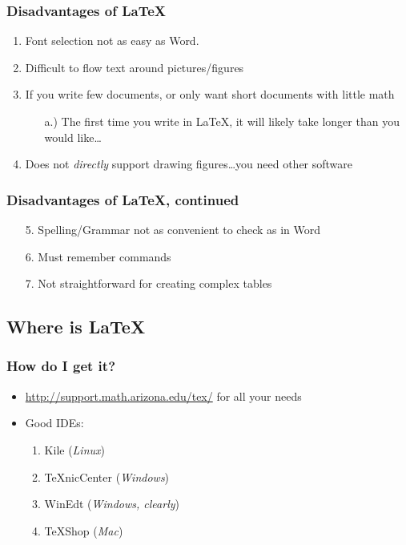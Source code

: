 \documentclass{beamer}
\begin{document}
\begin{frame}
   \frametitle{Disadvantages of \LaTeX}
   \begin{enumerate}
      \item Font selection not as easy as Word.
      
      \item Difficult to flow text around pictures\slash figures
      
      \item If you write few documents, or only want short documents with little math
      \begin{enumerate}
        \item[a.)] The first time you write in \LaTeX, it will likely take longer than you would like\ldots
      \end{enumerate}
      
      \item Does not \emph{directly} support drawing figures\ldots you need other software
   \end{enumerate}
\end{frame}
\begin{frame}
   \frametitle{Disadvantages of \LaTeX, continued}
   \begin{enumerate}
      \item[5.] Spelling\slash Grammar not as convenient to check as in Word
      
      \item[6.] Must remember commands
      
      \item[7.] Not straightforward for creating complex tables
   \end{enumerate}
\end{frame}
\subsection{Where is \LaTeX}
\begin{frame}
   \frametitle{How do I get it?}
   \begin{itemize}
      \item \href{http://support.math.arizona.edu/tex/}{http://support.math.arizona.edu/tex/} for all your needs
      
      \item Good IDEs:
        \begin{enumerate}
           \item Kile (\emph{Linux})
           
           \item TeXnicCenter (\emph{Windows})
           
           \item WinEdt (\emph{Windows, clearly})
           
           \item TeXShop (\emph{Mac})
        \end{enumerate}
   \end{itemize}
\end{frame}
\end{document}
